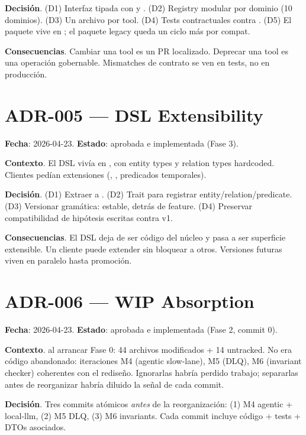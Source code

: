 \textbf{Decisión}. (D1) Interfaz  tipada con
 y . (D2) Registry modular por
dominio (10 dominios). (D3) Un archivo por tool. (D4) Tests
contractuales contra . (D5) El paquete vive
en ; el paquete legacy
 queda un ciclo más por compat.

\textbf{Consecuencias}. Cambiar una tool es un PR localizado.
Deprecar una tool es una operación gobernable. Mismatches de
contrato se ven en tests, no en producción.

\section*{ADR-005 — DSL Extensibility}

\textbf{Fecha}: 2026-04-23. \textbf{Estado}: aprobada e
implementada (Fase 3).

\textbf{Contexto}. El DSL vivía en
, con entity types y
relation types hardcoded. Clientes pedían extensiones
(, , predicados temporales).

\textbf{Decisión}. (D1) Extraer a . (D2)
Trait  para registrar entity/relation/predicate.
(D3) Versionar gramática:  estable, 
detrás de feature. (D4) Preservar compatibilidad de hipótesis
escritas contra v1.

\textbf{Consecuencias}. El DSL deja de ser código del núcleo y pasa
a ser superficie extensible. Un cliente puede extender sin bloquear
a otros. Versiones futuras viven en paralelo hasta promoción.

\section*{ADR-006 — WIP Absorption}

\textbf{Fecha}: 2026-04-23. \textbf{Estado}: aprobada e
implementada (Fase 2, commit 0).

\textbf{Contexto}.  al arrancar Fase 0: 44
archivos modificados + 14 untracked. No era código abandonado:
iteraciones M4 (agentic slow-lane), M5 (DLQ), M6 (invariant
checker) coherentes con el rediseño. Ignorarlas habría perdido
trabajo; separarlas antes de reorganizar habría diluido la señal de
cada commit.

\textbf{Decisión}. Tres commits atómicos \emph{antes} de la
reorganización: (1) M4 agentic + local-llm, (2) M5 DLQ, (3) M6
invariants. Cada commit incluye código + tests + DTOs asociados.


